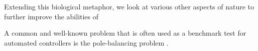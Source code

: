 Extending this biological metaphor, we look at various other aspects of nature to further improve the abilities of 



A common and well-known problem that is often used as a benchmark test for automated controllers is the pole-balancing problem \cite{Stanley2004}.














